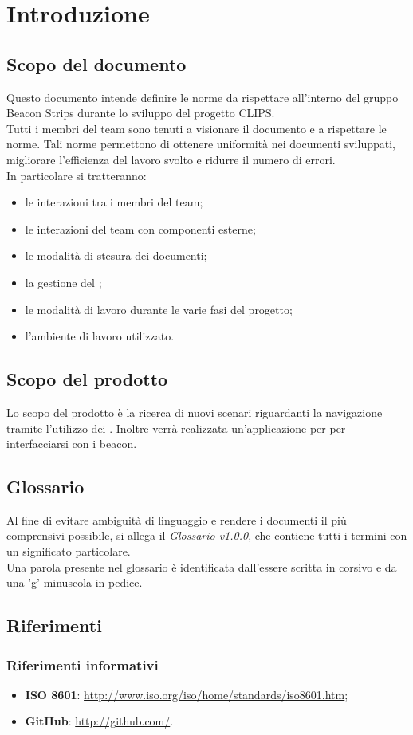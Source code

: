\section{Introduzione}
	\subsection{Scopo del documento}
	Questo documento intende definire le norme da rispettare all'interno del gruppo Beacon Strips durante lo sviluppo del progetto CLIPS. \\
	Tutti i membri del team sono tenuti a visionare il documento e a rispettare le norme. Tali norme permettono di ottenere uniformità nei documenti sviluppati,
	migliorare l'efficienza del lavoro svolto e ridurre il numero di errori. \\
	In particolare si tratteranno:
	\begin{itemize}
		\item le interazioni tra i membri del team;
		\item le interazioni del team con componenti esterne;
		\item le modalità di stesura dei documenti;
		\item la gestione del ;
		\item le modalità di lavoro durante le varie fasi del progetto;
		\item l'ambiente di lavoro utilizzato.
	\end{itemize}
	
	\subsection{Scopo del prodotto}
	Lo scopo del prodotto è la ricerca di nuovi scenari riguardanti la navigazione tramite l'utilizzo dei . Inoltre verrà realizzata un'applicazione per  per interfacciarsi con i beacon.
	\subsection{Glossario}
	Al fine di evitare ambiguità di linguaggio e rendere i documenti il più comprensivi possibile, si allega il \textit {Glossario v1.0.0}, che contiene tutti i termini 
	con un significato particolare. \\
	Una parola presente nel glossario è identificata dall'essere scritta in corsivo e da una 'g'  minuscola in pedice. %
	\subsection{Riferimenti}
		\subsubsection{Riferimenti informativi}
		\begin{itemize}
			\item \textbf{ISO 8601}: \url{http://www.iso.org/iso/home/standards/iso8601.htm};
			\item \textbf{GitHub}: \url{http://github.com/}.
		\end{itemize}
	
